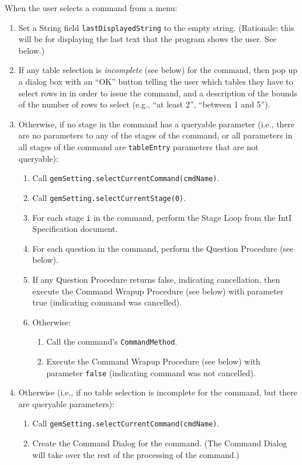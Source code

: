 \documentclass[11pt]{article}
\begin{document}
When the user selects a command from a menu:
\begin{enumerate}
\item Set a String field {\tt lastDisplayedString} to the empty string.
  (Rationale:  this will be for displaying the last text that the program
  shows the user.  See below.)
\item If any table selection is {\it incomplete} (see below) for the command,
  then pop up a dialog box with an ``OK'' button telling the user
  which tables they have to select rows in in order to issue the
  command, and a description of the bounds of the number of rows to
  select (e.g., ``at least 2'', ``between 1 and 5'').
\item Otherwise, if no stage in the command has a queryable parameter
  (i.e., there are no parameters to any of the stages of the command, or all
  parameters in all stages of the command are
  {\tt tableEntry} parameters that are not queryable):
  \begin{enumerate}
  \item Call {\tt gemSetting.selectCurrentCommand(cmdName)}.
  \item Call {\tt gemSetting.selectCurrentStage(0)}.
  \item For each stage \verb/i/ in the command, perform the Stage Loop
    from the IntI Specification document.
  \item For each question in the command, perform the Question Procedure
    (see below).
  \item If any Question Procedure returns false, indicating cancellation,
    then execute the Command Wrapup Procedure (see below) with parameter
    true (indicating command was cancelled).
  \item Otherwise:
    \begin{enumerate}
    \item Call the command's {\tt CommandMethod}.
    \item Execute the Command Wrapup Procedure (see below) with parameter
      {\tt false} (indicating command was not cancelled).
    \end{enumerate}
  \end{enumerate}
\item Otherwise (i.e., if no table selection is incomplete for
  the command, but there are queryable parameters):
  \begin{enumerate}
  \item Call {\tt gemSetting.selectCurrentCommand(cmdName)}.
  \item Create the Command Dialog for the command.
    (The Command Dialog will take over the rest of the processing
    of the command.)
  \end{enumerate}
\end{enumerate}
\end{document}
